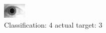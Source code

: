 \begin{figure}[h!]
\begin{center}
\includegraphics[width=0.60\columnwidth]{figures/ID1945_class_4_target_3.png}
\end{center}
\caption{ Classification: 4 actual target: 3}
\label{fig:ID1945_class_4_target_3}
\end{figure}
